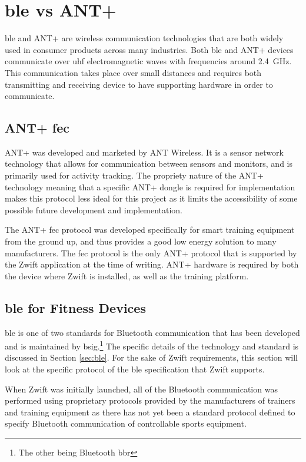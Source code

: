 \section{\ac{ble} vs ANT+}
\label{sec:ant}

\ac{ble} and ANT+ are wireless communication technologies that are both widely used in consumer products across many industries. Both \ac{ble} and ANT+ devices communicate over \ac{uhf} electromagnetic waves with frequencies around \SI{2.4}{\giga\hertz}. This communication takes place over small distances and requires both transmitting and receiving device to have supporting hardware in order to communicate.

\subsection{ANT+ \acl{fec}}

ANT+ was developed and marketed by ANT Wireless. It is a sensor network technology that allows for communication between sensors and monitors, and is primarily used for activity tracking. The propriety nature of the ANT+ technology meaning that a specific ANT+ dongle is required for implementation makes this protocol less ideal for this project as it limits the accessibility of some possible future development and implementation. 

The ANT+ \ac{fec} protocol was developed specifically for smart training equipment from the ground up, and thus provides a good low energy solution to many manufacturers. The \ac{fec} protocol is the only ANT+ protocol that is supported by the Zwift application at the time of writing. ANT+ hardware is required by both the device where Zwift is installed, as well as the training platform.

\subsection{\ac{ble} for Fitness Devices}
\ac{ble} is one of two standards for Bluetooth communication that has been developed and is maintained by \ac{bsig}.\footnote{The other being Bluetooth \ac{bbr}} The specific details of the technology and standard is discussed in Section \ref{sec:ble}. For the sake of Zwift requirements, this section will look at the specific protocol of the \ac{ble} specification that Zwift supports.

When Zwift was initially launched, all of the Bluetooth communication was performed using proprietary protocols provided by the manufacturers of trainers and training equipment as there has not yet been a standard protocol defined to specify Bluetooth communication of controllable sports equipment.

